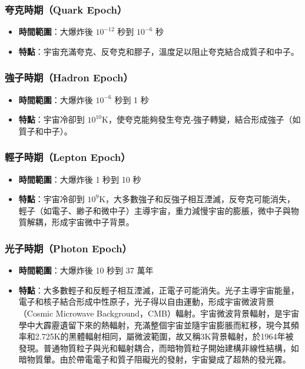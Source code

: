 \documentclass[a4paper,12pt]{report}
\begin{document}
\subsubsection{夸克時期（Quark Epoch）}
\begin{itemize}
\item \textbf{時間範圍}：大爆炸後 \(10^{-12}\) 秒到 \(10^{-6}\) 秒
\item \textbf{特點}：宇宙充滿夸克、反夸克和膠子，溫度足以阻止夸克結合成質子和中子。
\end{itemize}
\subsubsection{強子時期（Hadron Epoch）}
\begin{itemize}
\item \textbf{時間範圍}：大爆炸後 \(10^{-6}\) 秒到 1 秒
\item \textbf{特點}：宇宙冷卻到 \(10^{10}\text{K}\)，使夸克能夠發生夸克-強子轉變，結合形成強子（如質子和中子）。
\end{itemize}
\subsubsection{輕子時期（Lepton Epoch）}
\begin{itemize}
\item \textbf{時間範圍}：大爆炸後 1 秒到 10 秒
\item \textbf{特點}：宇宙冷卻到 \(10^{9}\text{K}\)，大多數強子和反強子相互湮滅，反夸克可能消失，輕子（如電子、緲子和微中子）主導宇宙，重力減慢宇宙的膨脹，微中子與物質解耦，形成宇宙微中子背景。
\end{itemize}
\subsubsection{光子時期（Photon Epoch）}
\begin{itemize}
\item \textbf{時間範圍}：大爆炸後 10 秒到 37 萬年
\item \textbf{特點}：大多數輕子和反輕子相互湮滅，正電子可能消失。光子主導宇宙能量，電子和核子結合形成中性原子，光子得以自由運動，形成宇宙微波背景（Cosmic Microwave Background，CMB）輻射。宇宙微波背景輻射，是宇宙學中大霹靂遺留下來的熱輻射，充滿整個宇宙並隨宇宙膨脹而紅移，現今其頻率和2.725K的黑體輻射相同，屬微波範圍，故又稱3K背景輻射，於1964年被發現。普通物質粒子與光和輻射耦合，而暗物質粒子開始建構非線性結構，如暗物質暈。由於帶電電子和質子阻礙光的發射，宇宙變成了超熱的發光霧。
\end{itemize}
\end{document}

